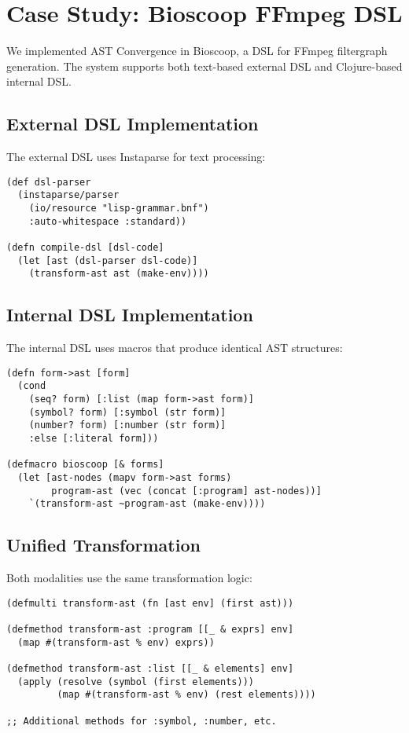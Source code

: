 \documentclass[conference]{IEEEtran}
\begin{document}
\section{Case Study: Bioscoop FFmpeg DSL}

We implemented AST Convergence in Bioscoop, a DSL for FFmpeg filtergraph generation. The system supports both text-based external DSL and Clojure-based internal DSL.

\subsection{External DSL Implementation}

The external DSL uses Instaparse for text processing:

\begin{lstlisting}[caption={External DSL Parser}]
(def dsl-parser 
  (instaparse/parser 
    (io/resource "lisp-grammar.bnf") 
    :auto-whitespace :standard))

(defn compile-dsl [dsl-code]
  (let [ast (dsl-parser dsl-code)]
    (transform-ast ast (make-env))))
\end{lstlisting}

\subsection{Internal DSL Implementation}

The internal DSL uses macros that produce identical AST structures:

\begin{lstlisting}[caption={Internal DSL Macro}]
(defn form->ast [form]
  (cond
    (seq? form) [:list (map form->ast form)]
    (symbol? form) [:symbol (str form)]
    (number? form) [:number (str form)]
    :else [:literal form]))

(defmacro bioscoop [& forms]
  (let [ast-nodes (mapv form->ast forms)
        program-ast (vec (concat [:program] ast-nodes))]
    `(transform-ast ~program-ast (make-env))))
\end{lstlisting}

\subsection{Unified Transformation}

Both modalities use the same transformation logic:

\begin{lstlisting}[caption={Unified AST Transformation}]
(defmulti transform-ast (fn [ast env] (first ast)))

(defmethod transform-ast :program [[_ & exprs] env]
  (map #(transform-ast % env) exprs))

(defmethod transform-ast :list [[_ & elements] env]
  (apply (resolve (symbol (first elements))) 
         (map #(transform-ast % env) (rest elements))))

;; Additional methods for :symbol, :number, etc.
\end{lstlisting}
\end{document}
